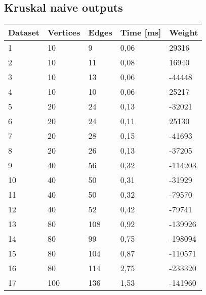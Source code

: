 \subsection{Kruskal naive outputs}
\begin{longtable}{lllll}
    \textbf{Dataset} & \textbf{Vertices} & \textbf{Edges} & \textbf{Time [ms]} & \textbf{Weight} \\
    \endhead
    1                & 10             & 9              & 0,06        & 29316           \\
    2                & 10             & 11             & 0,08        & 16940           \\
    3                & 10             & 13             & 0,06        & -44448          \\
    4                & 10             & 10             & 0,06        & 25217           \\
    5                & 20             & 24             & 0,13        & -32021          \\
    6                & 20             & 24             & 0,11        & 25130           \\
    7                & 20             & 28             & 0,15        & -41693          \\
    8                & 20             & 26             & 0,13        & -37205          \\
    9                & 40             & 56             & 0,32        & -114203         \\
    10               & 40             & 50             & 0,31        & -31929          \\
    11               & 40             & 50             & 0,32        & -79570          \\
    12               & 40             & 52             & 0,42        & -79741          \\
    13               & 80             & 108            & 0,92        & -139926         \\
    14               & 80             & 99             & 0,75        & -198094         \\
    15               & 80             & 104            & 0,87        & -110571         \\
    16               & 80             & 114            & 2,75        & -233320         \\
    17               & 100            & 136            & 1,53        & -141960         \\

\end{longtable}
